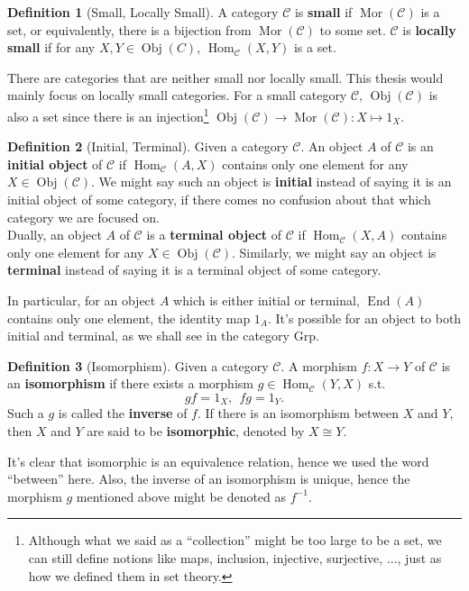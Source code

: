 \documentclass{article}
\theoremstyle{definition}
\newtheorem{definition}{Definition}[section]
\theoremstyle{definition}
\theoremstyle{remark}
\DeclareMathOperator{\Obj}{Obj}
\DeclareMathOperator{\Mor}{Mor}
\DeclareMathOperator{\Hom}{Hom}
\DeclareMathOperator{\End}{End}
\begin{document}
	\begin{definition}[Small, Locally Small]
	A category $\mathcal{C}$ is \textbf{small} if $\Mor(\mathcal{C})$ is a set, or equivalently, there is a bijection from $\Mor(\mathcal{C})$ to some set. $\mathcal{C}$ is \textbf{locally small} if for any $X,Y\in \Obj(C)$, $\Hom_\mathcal{C}(X,Y)$ is a set.
	\end{definition}
There are categories that are neither small nor locally small. This thesis would mainly focus on locally small categories. For a small category $\mathcal{C}$, $\Obj(\mathcal{C})$ is also a set since there is an injection\footnote{Although what we said as a ``collection'' might be too large to be a set, we can still define notions like maps, inclusion, injective, surjective, ..., just as how we defined them in set theory.} $\Obj(\mathcal{C})\to\Mor(\mathcal{C}):X\mapsto 1_X$.
	\begin{definition}[Initial, Terminal]
	Given a category $\mathcal{C}$. An object $A$ of $\mathcal{C}$ is an \textbf{initial object} of $\mathcal{C}$ if $\Hom_\mathcal{C}(A,X)$ contains only one element for any $X\in \Obj(\mathcal{C})$. We might say such an object is \textbf{initial} instead of saying it is an initial object of some category, if there comes no confusion about that which category we are focused on. \\
	Dually, an object $A$ of $\mathcal{C}$ is a \textbf{terminal object} of $\mathcal{C}$ if $\Hom_\mathcal{C}(X,A)$ contains only one element for any $X\in \Obj(\mathcal{C})$. Similarly, we might say an object is \textbf{terminal} instead of saying it is a terminal object of some category.
	\end{definition}
In particular, for an object $A$ which is either initial or terminal, $\End(A)$ contains only one element, the identity map $1_A$. It's possible for an object to both initial and terminal, as we shall see in the category $\mathrm{Grp}$.
	\begin{definition}[Isomorphism]
	Given a category $\mathcal{C}$. A morphism $f:X\to Y$ of $\mathcal{C}$ is an \textbf{isomorphism} if there exists a morphism $g\in\Hom_\mathcal{C}(Y,X)$ s.t.
	\[gf=1_{X},\ \ fg=1_{Y}.\]
	Such a $g$ is called the \textbf{inverse} of $f$. If there is an isomorphism between $X$ and $Y$, then $X$ and $Y$ are said to be \textbf{isomorphic}, denoted by $X\cong Y$.
	\end{definition}
It's clear that isomorphic is an equivalence relation, hence we used the word ``between'' here. Also, the inverse of an isomorphism is unique, hence the morphism $g$ mentioned above might be denoted as $f^{-1}$.\par
\end{document}
